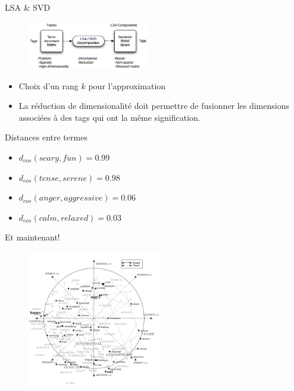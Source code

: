 \documentclass{beamer}
\begin{document}

\begin{frame}{LSA \& SVD}
\begin{figure}
    \centering
    \includegraphics[width=200px]{images/lsa_cyril_laurier.png}
\end{figure}
\begin{itemize}
    \item Choix d'un rang $k$ pour l'approximation
    \item La réduction de dimensionalité doit permettre de fusionner les
        dimensions associées à des tags qui ont la même signification.
\end{itemize}

\end{frame}
\begin{frame}{Distances entre termes}
    \begin{itemize}
        \item $d_{cos}(scary, fun) = 0.99$
        \item $d_{cos}(tense, serene) = 0.98$
        \item $d_{cos}(anger, aggressive) = 0.06$
        \item $d_{cos}(calm, relaxed) = 0.03$
    \end{itemize}
\end{frame}

\begin{frame}{Et maintenant!}
\begin{figure}
    \centering
    \includegraphics[width=220px]{images/result_mood_space.png}
\end{figure}

\end{frame}
\end{document}
